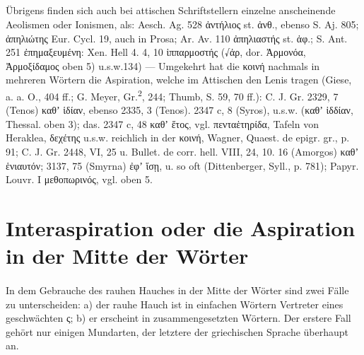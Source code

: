 {\small\noindent\subparagraph{} Übrigens finden sich auch bei attischen
  Schriftstellern einzelne anscheinende Aeolismen oder Ionismen, als: Aesch. Ag.
  528 ἀντήλιος st. ἀνθ., ebenso S. Aj. 805; ἀπηλιώτης Eur. Cycl. 19, auch in
  Prosa; Ar. Av. 110 ἀπηλιαστής st. ἀφ.; S. Ant. 251 ἐπημαξευμένη: Xen. Hell 4.
  4, 10 ἱππαρμοστής (√ἀρ, dor. Ἀρμονόα, Ἀρμοξίδαμος oben 5) u.s.w.134)
  — Umgekehrt hat die κοινή nachmals in mehreren Wörtern die Aspiration, welche
  im Attischen den Lenis tragen (Giese, a. a. O., 404 ff.; G. Meyer,
  Gr.\textsuperscript{2}, 244; Thumb, S. 59, 70 ff.): C. J. Gr. 2329, 7 (Tenos)
  καθʼ ἱδίαν, ebenso 2335, 3 (Tenos). 2347 c, 8 (Syros), u.s.w. (καθʼ ἱδδίαν,
  Thessal. oben 3); das. 2347 c, 48 καθʼ ἕτος, vgl. πενταἑτηρίδα, Tafeln von
  Heraklea, δεχέτης u.s.w. reichlich in der κοινή, Wagner, Quaest. de epigr.
  gr., p. 91; C. J. Gr. 2448, VI, 25 u. Bullet. de corr. hell. VIII, 24, 10. 16
  (Amorgos) καθʼ ἑνιαυτόν; 3137, 75 (Smyrna) ἐφʼ ἵσῃ, u. so oft (Dittenberger,
Syll., p. 781); Papyr. Louvr. I μεθοπωρινός, vgl. oben 5.}

\section{Interaspiration oder die Aspiration in der Mitte der Wörter}\label{sec:23}

\paragraph{} In dem Gebrauche des rauhen Hauches in der Mitte der Wörter sind
zwei Fälle zu unterscheiden: a) der rauhe Hauch ist in einfachen Wörtern
Vertreter eines geschwächten ς; b) er erscheint in zusammengesetzten Wörtern.
Der erstere Fall gehört nur einigen Mundarten, der letztere der griechischen
Sprache überhaupt an. 

